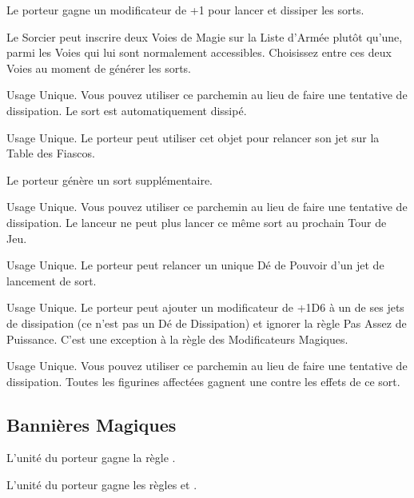 Le porteur gagne un modificateur de +1 pour lancer et dissiper les sorts.

Le Sorcier peut inscrire deux Voies de Magie sur la Liste d'Armée plutôt qu'une, parmi les Voies qui lui sont normalement accessibles. Choisissez entre ces deux Voies au moment de générer les sorts.

Usage Unique. Vous pouvez utiliser ce parchemin au lieu de faire une tentative de dissipation. Le sort est automatiquement dissipé.

Usage Unique. Le porteur peut utiliser cet objet pour relancer son jet sur la Table des Fiascos.

Le porteur génère un sort supplémentaire.

Usage Unique. Vous pouvez utiliser ce parchemin au lieu de faire une tentative de dissipation. Le lanceur ne peut plus lancer ce même sort au prochain Tour de Jeu.

Usage Unique. Le porteur peut relancer un unique Dé de Pouvoir d'un jet de lancement de sort.

Usage Unique. Le porteur peut ajouter un modificateur de +1D6 à un de ses jets de dissipation (ce n'est pas un Dé de Dissipation) et ignorer la règle Pas Assez de Puissance. C'est une exception à la règle des Modificateurs Magiques.

Usage Unique. Vous pouvez utiliser ce parchemin au lieu de faire une tentative de dissipation. Toutes les figurines affectées gagnent une  contre les effets de ce sort.

\endpricelist

\newpage
\hypertarget{magicalstandards}{\subsection{Bannières Magiques}}
\label{magical_standards}

\startpricelist

L'unité du porteur gagne la règle .

L'unité du porteur gagne les règles \swiftstride{} et \strider{}.

